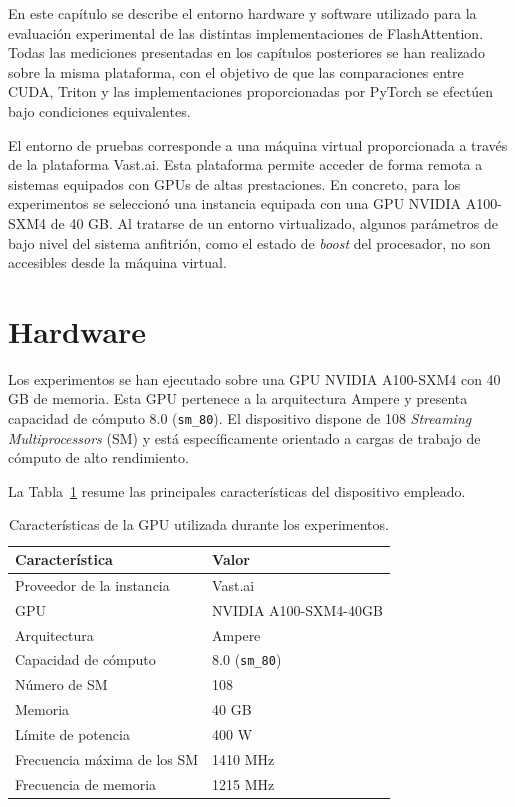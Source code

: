 En este capítulo se describe el entorno hardware y software utilizado para la evaluación experimental de las distintas implementaciones de FlashAttention. Todas las mediciones presentadas en los capítulos posteriores se han realizado sobre la misma plataforma, con el objetivo de que las comparaciones entre CUDA, Triton y las implementaciones proporcionadas por PyTorch se efectúen bajo condiciones equivalentes.

El entorno de pruebas corresponde a una máquina virtual proporcionada a través de la plataforma Vast.ai. Esta plataforma permite acceder de forma remota a sistemas equipados con GPUs de altas prestaciones. En concreto, para los experimentos se seleccionó una instancia equipada con una GPU NVIDIA A100-SXM4 de 40 GB. Al tratarse de un entorno virtualizado, algunos parámetros de bajo nivel del sistema anfitrión, como el estado de \textit{boost} del procesador, no son accesibles desde la máquina virtual.

\section{Hardware}

Los experimentos se han ejecutado sobre una GPU NVIDIA A100-SXM4 con 40 GB de memoria. Esta GPU pertenece a la arquitectura Ampere y presenta capacidad de cómputo 8.0 (\texttt{sm\_80}). El dispositivo dispone de 108 \textit{Streaming Multiprocessors} (SM) y está específicamente orientado a cargas de trabajo de cómputo de alto rendimiento.

La Tabla~\ref{tab:gpu_entorno} resume las principales características del dispositivo empleado.

\begin{table}[H]
\centering
\caption{Características de la GPU utilizada durante los experimentos.}
\label{tab:gpu_entorno}
\begin{tabular}{ll}
\hline
\textbf{Característica} & \textbf{Valor} \\
\hline
Proveedor de la instancia & Vast.ai \\
GPU & NVIDIA A100-SXM4-40GB \\
Arquitectura & Ampere \\
Capacidad de cómputo & 8.0 (\texttt{sm\_80}) \\
Número de SM & 108 \\
Memoria & 40 GB \\
Límite de potencia & 400 W \\
Frecuencia máxima de los SM & 1410 MHz \\
Frecuencia de memoria & 1215 MHz \\
\hline
\end{tabular}
\end{table}

